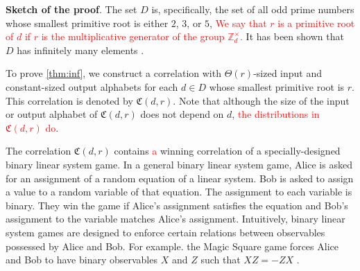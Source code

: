 \documentclass[11pt,letterpaper]{article}
\newcommand{\Z}{\mathbb{Z}}
\newcommand{\Zd}{\Z_d^{\times}}
\newcommand{\1}{\mathbb{1}}
\newcommand{\fC}{\mathfrak{C}}
\newcommand{\hf}[1]{\textcolor{red}{#1}}
\newtheorem{theorem}{Theorem}[section]
\theoremstyle{definition}
\begin{document}
\textbf{Sketch of the proof}.
The set $D$ is, specifically, the set of all 
odd prime numbers whose smallest primitive root 
is either $2$, $3$, or $5$, 
\hf{We say that $r$ is a primitive root of $d$ if $r$ is the 
multiplicative generator of the group $\Zd$.}
It has been shown that $D$ has infinitely many elements \cite{murty1988}.

To prove \cref{thm:inf}, we construct a correlation with $\Theta(r)$-sized
input and constant-sized output alphabets
for each $d \in D$ whose smallest primitive root is $r$.
This correlation is denoted by $\fC(d,r)$.
Note that although the size of the input or output alphabet of $\fC(d,r)$ does not depend on $d$, 
\hf{the distributions in $\fC(d,r)$ do}. 

The correlation $\fC(d,r)$ contains \hf{a} winning correlation of a specially-designed binary linear system game.  
In a general binary linear system game, Alice is asked for an assignment of a random equation 
of a linear system.
Bob is asked to assign a value to a random variable of that equation.
The assignment to each variable is binary. 
They win the game if Alice's assignment satisfies the equation and Bob's
assignment to the variable matches Alice's assignment.
Intuitively, binary linear system games are designed to enforce certain
relations between observables possessed by Alice and Bob.
For example. the Magic Square game \cite{magic_square} forces
Alice and Bob to have binary observables $X$ and $Z$ such that $XZ = -ZX$ \cite{wu2016, coladan2017}.  
\end{document}
